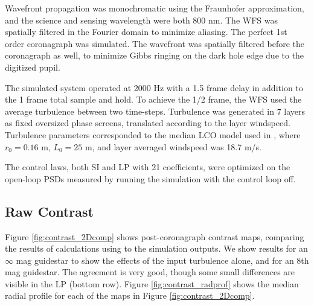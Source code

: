 \documentclass[10pt,preprint]{aastex631}
\begin{document}
Wavefront propagation was monochromatic using the Fraunhofer approximation, and the science and sensing wavelength were both 800 nm.  The WFS was spatially filtered in the Fourier domain to minimize aliasing.  The perfect 1st order coronagraph was simulated.  The wavefront was spatially filtered before the coronagraph as well, to minimize Gibbs ringing on the dark hole edge due to the digitized pupil.

The simulated system operated at 2000 Hz with a 1.5 frame delay in addition to the 1 frame total sample and hold.  To achieve the 1/2 frame, the WFS used the average turbulence between two time-steps.  Turbulence was generated in 7 layers as fixed oversized phase screens, translated according to the layer windspeed.   Turbulence parameters corresponded to the median LCO model used in \citet{2018JATIS...4a9001M}, where $r_0 = 0.16$ m, $L_0 = 25$ m, and layer averaged windspeed was 18.7 m/s.  

The control laws, both SI and LP with 21 coefficients, were optimized on the open-loop PSDs measured by running the simulation with the control loop off.

\subsection{Raw Contrast}
Figure \ref{fig:contrast_2Dcomp} shows post-coronagraph contrast maps, comparing the results of calculations using \citet{2018JATIS...4a9001M} to the simulation outputs.  We show results for an $\infty$ mag guidestar to show the effects of the input turbulence alone, and for an $8$th mag guidestar.  The agreement is very good, though some small differences are visible in the LP (bottom row). Figure \ref{fig:contrast_radprof} shows the median radial profile for each of the maps in Figure \ref{fig:contrast_2Dcomp}.  
\end{document}
